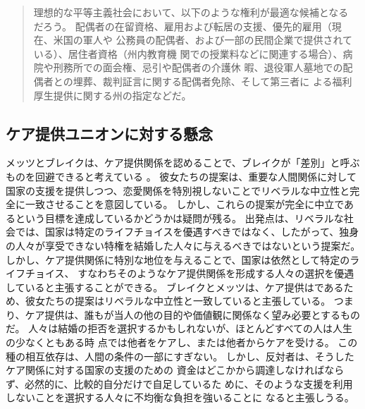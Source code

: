 \documentclass[paper=a4,book,openany]{jlreq}
\begin{document}
\begin{quote}
理想的な平等主義社会において、以下のような権利が最適な候補となる
だろう。
配偶者の在留資格、雇用および転居の支援、優先的雇用（現在、米国の軍人や
公務員の配偶者、および一部の民間企業で提供されている）、居住者資格（州内教育機
関での授業料などに関連する場合）、病院や刑務所での面会権、忌引や配偶者の介護休
暇、退役軍人墓地での配偶者との埋葬、裁判証言に関する配偶者免除、そして第三者に
よる福利厚生提供に関する州の指定などだ。
\citep[p.157]{brake12:_minim_marriag}
\end{quote}

\subsection{ケア提供ユニオンに対する懸念}

メッツとブレイクは、ケア提供関係を認めることで、ブレイクが「差別」と呼ぶものを回避できると考えている
\citep[p.89]{brake12:_minim_marriag}。
彼女たちの提案は、重要な人間関係に対して国家の支援を提供しつつ、恋愛関係を特別視しないことでリベラルな中立性と完全に一致させることを意図している。
しかし、これらの提案が完全に中立であるという目標を達成しているかどうかは疑問が残る。
出発点は、リベラルな社会では、国家は特定のライフチョイスを優遇すべきではなく、したがって、独身の人々が享受できない特権を結婚した人々に与えるべきではないという提案だ。
しかし、ケア提供関係に特別な地位を与えることで、国家は依然として特定のライフチョイス、
すなわちそのようなケア提供関係を形成する人々の選択を優遇していると主張することができる。
ブレイクとメッツは、ケア提供はであるため、彼女たちの提案はリベラルな中立性と一致していると主張している。
つまり、ケア提供は、誰もが当人の他の目的や価値観に関係なく望み必要とするものだ。
人々は結婚の拒否を選択するかもしれないが、ほとんどすべての人は人生の少なくともある時
点では他者をケアし、または他者からケアを受ける。
この種の相互依存は、人間の条件の一部にすぎない。
しかし、反対者は、そうしたケア関係に対する国家の支援のための
資金はどこかから調達しなければならず、必然的に、比較的自分だけで自足しているた
めに、そのような支援を利用しないことを選択する人々に不均衡な負担を強いることに
なると主張しうる。
\end{document}
